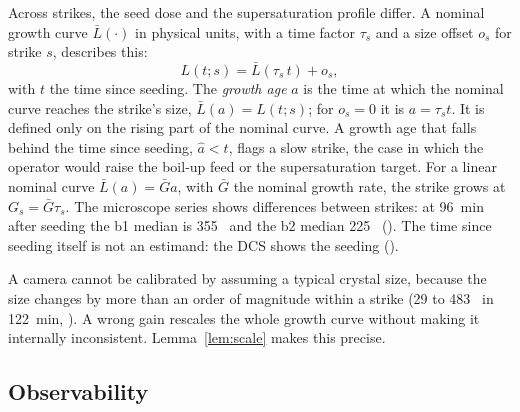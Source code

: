Across strikes, the seed dose and the supersaturation profile differ. A nominal growth curve $\bar L(\cdot)$ in
physical units, with a time factor $\tau_s$ and a size offset $o_s$ for strike $s$, describes this:
\begin{equation}\label{eq:nominal}
L(t; s) = \bar L(\tau_s\, t) + o_s,
\end{equation}
with $t$ the time since seeding. The \emph{growth age} $a$ is the time at which the nominal curve reaches the strike's
size, $\bar L(a) = L(t; s)$; for $o_s = 0$ it is $a = \tau_s t$. It is defined only on the rising part of the nominal
curve. A growth age that falls behind the time since seeding, $\hat a < t$, flags a slow strike, the case in
which the operator would raise the boil-up feed or the supersaturation target. For a linear nominal curve
$\bar L(a) = \bar G a$, with $\bar G$ the nominal growth rate, the strike grows at $G_s = \bar G \tau_s$. The
microscope series shows differences between strikes: at 96~min after seeding the b1 median is 355~\um{} and the b2
median 225~\um{} (). The time since seeding itself is not an estimand: the DCS shows the
seeding ().

A camera cannot be calibrated by assuming a typical crystal size, because the size changes by more than an order of
magnitude within a strike (29 to 483~\um{} in 122~min, ). A wrong gain rescales the whole
growth curve without making it internally inconsistent. Lemma~\ref{lem:scale} makes this precise.

\subsection{Observability}\label{sec:observability}


